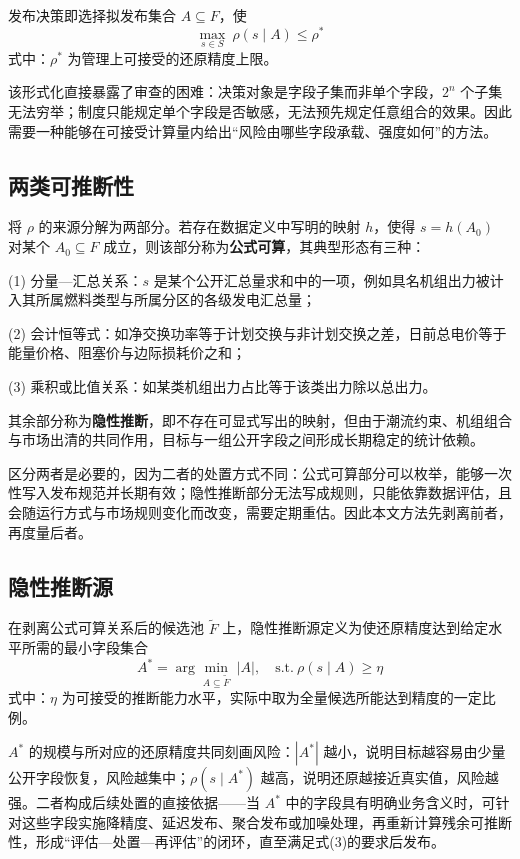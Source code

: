 \documentclass[UTF8,zihao=5,twoside]{ctexart}
\begin{document}
发布决策即选择拟发布集合 $A\subseteq F$，使
\begin{equation}
\max_{s\in S}\ \rho(s\mid A)\le \rho^{\ast}
\end{equation}
式中：$\rho^{\ast}$ 为管理上可接受的还原精度上限。

该形式化直接暴露了审查的困难：决策对象是字段子集而非单个字段，$2^n$ 个子集无法穷举；制度只能规定单个字段是否敏感，无法预先规定任意组合的效果。因此需要一种能够在可接受计算量内给出“风险由哪些字段承载、强度如何”的方法。

\subsection{两类可推断性}

将 $\rho$ 的来源分解为两部分。若存在数据定义中写明的映射 $h$，使得 $s=h(A_0)$ 对某个 $A_0\subseteq F$ 成立，则该部分称为\textbf{公式可算}，其典型形态有三种：

(1) 分量—汇总关系：$s$ 是某个公开汇总量求和中的一项，例如具名机组出力被计入其所属燃料类型与所属分区的各级发电汇总量；

(2) 会计恒等式：如净交换功率等于计划交换与非计划交换之差，日前总电价等于能量价格、阻塞价与边际损耗价之和；

(3) 乘积或比值关系：如某类机组出力占比等于该类出力除以总出力。

其余部分称为\textbf{隐性推断}，即不存在可显式写出的映射，但由于潮流约束、机组组合与市场出清的共同作用，目标与一组公开字段之间形成长期稳定的统计依赖。

区分两者是必要的，因为二者的处置方式不同：公式可算部分可以枚举，能够一次性写入发布规范并长期有效；隐性推断部分无法写成规则，只能依靠数据评估，且会随运行方式与市场规则变化而改变，需要定期重估。因此本文方法先剥离前者，再度量后者。

\subsection{隐性推断源}

在剥离公式可算关系后的候选池 $\tilde F$ 上，隐性推断源定义为使还原精度达到给定水平所需的最小字段集合
\begin{equation}
A^{\ast}=\arg\min_{A\subseteq\tilde F}\ |A|,\quad \mathrm{s.t.}\ \rho(s\mid A)\ge \eta
\end{equation}
式中：$\eta$ 为可接受的推断能力水平，实际中取为全量候选所能达到精度的一定比例。

$A^{\ast}$ 的规模与所对应的还原精度共同刻画风险：$|A^{\ast}|$ 越小，说明目标越容易由少量公开字段恢复，风险越集中；$\rho(s\mid A^{\ast})$ 越高，说明还原越接近真实值，风险越强。二者构成后续处置的直接依据——当 $A^{\ast}$ 中的字段具有明确业务含义时，可针对这些字段实施降精度、延迟发布、聚合发布或加噪处理，再重新计算残余可推断性，形成“评估—处置—再评估”的闭环，直至满足式(3)的要求后发布。
\end{document}
